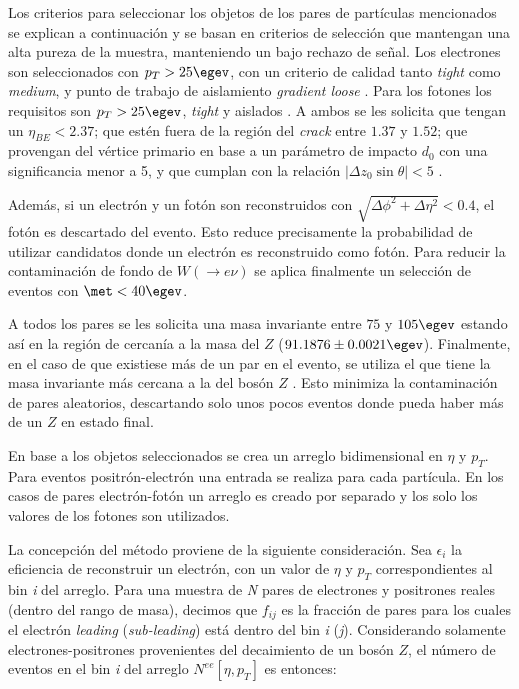 Los criterios para seleccionar los objetos de los pares de partículas mencionados se explican a continuación y se basan en criterios de selección que mantengan una alta pureza de la muestra, manteniendo un bajo rechazo de señal.
Los electrones  son seleccionados con $p_{T} > 25 \egev$, con un criterio de calidad tanto \textit{tight} como \textit{medium}, y punto de trabajo de aislamiento \textit{gradient loose} \cite{ATLAS-CONF-2016-024}. Para los fotones los requisitos son $p_{T} > 25 \egev$, \textit{tight} y aislados \cite{STDM-2010-08}. A ambos se les solicita que tengan un $\eta_{BE}<2.37$; que estén fuera de la región del \textit{crack} entre $1.37$ y $1.52$; que provengan del vértice primario en base a un parámetro de impacto $d_{0}$ con una significancia menor a 5, y que cumplan con la relación $|\Delta z_{0}\sin\theta|<5$ .

Además, si un electrón y un fotón son reconstruidos con $\sqrt{\Delta\phi^{2}+\Delta\eta^{2}}<0.4$, el fotón es descartado del evento. Esto reduce precisamente la probabilidad de utilizar candidatos donde un electrón es reconstruido como fotón. Para reducir la contaminación de fondo de $W (\rightarrow e\nu)$ se aplica finalmente un selección de eventos con $\met < 40 \egev$. 


A todos los pares se les solicita una masa invariante entre $75$ y $105 \egev$  estando así en la región de cercanía a la masa del $Z$ ($91.1876 \pm 0.0021 \egev$\cite{Olive:2016xmw}). Finalmente, en el caso de que existiese más de un par en el evento, se utiliza el que tiene la masa invariante más cercana a la del bosón $Z$ . Esto minimiza la contaminación de pares aleatorios, descartando solo unos pocos eventos donde pueda haber más de un $Z$ en estado final.


En base a los objetos seleccionados se crea un arreglo bidimensional en  $\eta$ y $p_{T}$. Para eventos positrón-electrón una entrada se realiza para cada partícula. En los casos de pares electrón-fotón un arreglo es creado por separado y los solo los valores de los fotones son utilizados.

La concepción del método proviene de la siguiente consideración. Sea $\epsilon_{i}$ la eficiencia de reconstruir un electrón, con un valor de $\eta$ y $p_{T}$ correspondientes al bin \textit{i} del arreglo. Para una muestra de \textit{N} pares de electrones y positrones reales (dentro del rango de masa), decimos que $f_{ij}$ es la fracción de pares para los cuales el electrón \textit{leading} (\textit{sub-leading}) está dentro del bin \textit{i} (\textit{j}). Considerando solamente electrones-positrones provenientes del decaimiento de un bosón $Z$, el número de eventos en el bin \textit{i} del arreglo $N^{ee}[\eta , p_{T}]$ es entonces:

